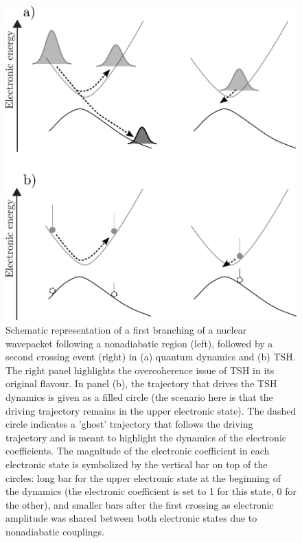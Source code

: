 \documentclass[9pt,bestpractices]{livecoms}
\begin{document}
\begin{figure}[h!]
    \centering
    \includegraphics[width=1.0\linewidth]{./figures/decoherence.png}
    \caption{Schematic representation of a first branching of a nuclear wavepacket following a nonadiabatic region (left), followed by a second crossing event (right) in (a) quantum dynamics and (b) TSH. The right panel highlights the overcoherence issue of TSH in its original flavour. In panel (b), the trajectory that drives the TSH dynamics is given as a filled circle (the scenario here is that the driving trajectory remains in the upper electronic state). The dashed circle indicates a 'ghost' trajectory that follows the driving trajectory and is meant to highlight the dynamics of the electronic coefficients. The magnitude of the electronic coefficient in each electronic state is symbolized by the vertical bar on top of the circles: long bar for the upper electronic state at the beginning of the dynamics (the electronic coefficient is set to 1 for this state, 0 for the other), and smaller bars after the first crossing as electronic amplitude was shared between both electronic states due to nonadiabatic couplings. 
}
    \label{decoherence}
\end{figure}
\end{document}

